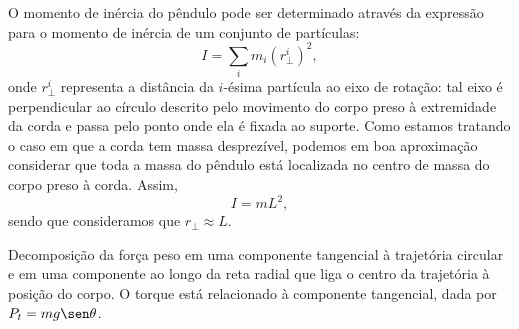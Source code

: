 O momento de inércia do pêndulo pode ser determinado através da expressão para o momento de inércia de um conjunto de partículas:
\begin{equation}
    I = \sum_i m_i (r_\perp^i)^2,
\end{equation}
%
onde $r_\perp^i$ representa a distância da $i$-ésima partícula ao eixo de rotação: tal eixo é perpendicular ao círculo descrito pelo movimento do corpo preso à extremidade da corda e passa pelo ponto onde ela é fixada ao suporte. Como estamos tratando o caso em que a corda tem massa desprezível, podemos em boa aproximação considerar que toda a massa do pêndulo está localizada no centro de massa do corpo preso à corda. Assim,
\begin{equation}
    I = m L^2,
\end{equation}
%
sendo que consideramos que $r_\perp \approx L$.

\begin{marginfigure}[2cm]
\centering
{}
\caption{Decomposição da força peso em uma componente tangencial à trajetória circular e em uma componente ao longo da reta radial que liga o centro da trajetória à posição do corpo. O torque está relacionado à componente tangencial, dada por $P_t = mg\sen\theta$.}
\end{marginfigure}

